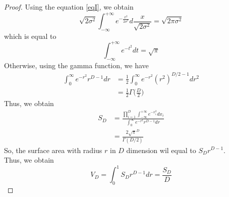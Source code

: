 \documentclass[12pt]{article}
\newenvironment{exercise}[2][Ex]{\begin{trivlist}
\item[\hskip \labelsep {\bfseries #1}\hskip \labelsep {\bfseries #2.}]}{\end{trivlist}}
\begin{document}
\begin{exercise}{1.18(**)}
    \begin{proof}
        Using the equation \ref{eqI}, we obtain
        \[
        \sqrt{2\sigma^2}\int_{-\infty}^{+\infty}e^{-\frac{x^2}{2\sigma^2}}d\frac{x}
        {\sqrt{2\sigma^2}}=\sqrt{2\pi\sigma^2}
        \]
        which is equal to
        \begin{equation}
            \label{eq:eint}
            \int_{-\infty}^{+\infty}e^{-t^2}dt=\sqrt{\pi}
        \end{equation}
        Otherwise, using the gamma function, we have 
        \begin{align}
            \int_0^\infty e^{-r^2}r^{D-1}dr&=\frac{1}{2}\int_0^\infty
            e^{-r^2}(r^2)^{D/2-1}dr^2\nonumber\\
            &=\frac{1}{2}\Gamma\Big(\frac{D}{2}\Big)
        \end{align}
        Thus, we obtain
        \begin{align}
            S_D&=\frac{\prod_{i=1}^D\int_{-\infty}^{+\infty}e^{-x_i^2}dx_i}
            {\int_0^\infty e^{-r^2}r^{D-1}dr}\nonumber\\
            &=\frac{2\sqrt{\pi}^D}{\Gamma(D/2)}
        \end{align}
        So, the surface area with radius $r$ in $D$ dimension wil equal to $S_Dr^{D-1}$.\\
        Thus, we obtain
        \begin{equation}
            V_D=\int_0^1S_Dr^{D-1}dr=\frac{S_D}{D}
        \end{equation}
    \end{proof}
\end{exercise}
\end{document}
